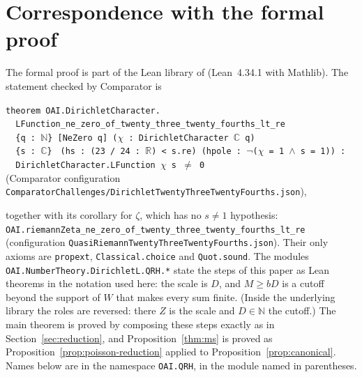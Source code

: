 \section{Correspondence with the formal proof}\label{app:lean}

The formal proof is part of the Lean library of \cite{OpenAI26} (Lean~4.34.1 with Mathlib). The
statement checked by Comparator is
\begin{center}
\small
\texttt{theorem OAI.DirichletCharacter.}\\
\texttt{\ \ LFunction\_ne\_zero\_of\_twenty\_three\_twenty\_fourths\_lt\_re}\\
\texttt{\ \ \{q :\ }$\mathbb N$\texttt{\} [NeZero q] (}$\chi$\texttt{ :\ DirichletCharacter }$\mathbb C$\texttt{ q)}\\
\texttt{\ \ \{s :\ }$\mathbb C$\texttt{\}}
\texttt{ (hs :\ (23 / 24 :\ }$\mathbb R$\texttt{) < s.re) (hpole :\ }$\neg$\texttt{(}$\chi$\texttt{ = 1 }$\wedge$\texttt{ s = 1)) :}\\
\texttt{\ \ DirichletCharacter.LFunction }$\chi$\texttt{ s }$\ne$\texttt{ 0}\\[3pt]
(Comparator configuration \texttt{ComparatorChallenges/\allowbreak DirichletTwentyThreeTwentyFourths.json}),
\end{center}
together with its corollary for $\zeta$, which has no $s\ne1$ hypothesis:
\texttt{OAI.riemannZeta\_ne\_zero\_of\_\allowbreak twenty\_\allowbreak three\_\allowbreak twenty\_\allowbreak fourths\_\allowbreak lt\_\allowbreak re}
(configuration \texttt{Quasi\allowbreak Riemann\allowbreak Twenty\allowbreak Three\allowbreak Twenty\allowbreak Fourths.json}).
Their only axioms are \texttt{propext}, \texttt{Classical.choice} and \texttt{Quot.sound}. The
modules \texttt{OAI.NumberTheory.\allowbreak DirichletL.\allowbreak QRH.*} state the steps of this paper as Lean theorems
in the notation used here: the scale is $D$, and $M\ge bD$ is a cutoff beyond the support of $W$
that makes every sum finite. (Inside the underlying library the roles are reversed: there $Z$ is
the scale and $D\in\mathbb N$ the cutoff.) The main theorem is proved by composing these steps
exactly as in Section~\ref{sec:reduction}, and Proposition~\ref{thm:ms} is proved as
Proposition~\ref{prop:poisson-reduction} applied to Proposition~\ref{prop:canonical}. Names below
are in the namespace \texttt{OAI.QRH}, in the module named in parentheses.

